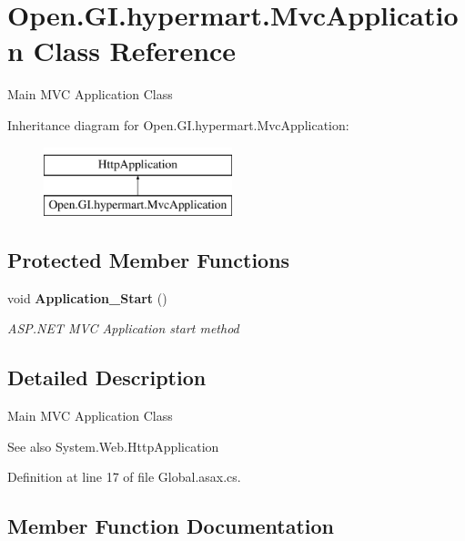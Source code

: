 \section{Open.\+G\+I.\+hypermart.\+Mvc\+Application Class Reference}
\label{class_open_1_1_g_i_1_1hypermart_1_1_mvc_application}


Main M\+VC Application Class  


Inheritance diagram for Open.\+G\+I.\+hypermart.\+Mvc\+Application\+:\begin{figure}[H]
\begin{center}
\leavevmode
\includegraphics[height=2.000000cm]{class_open_1_1_g_i_1_1hypermart_1_1_mvc_application}
\end{center}
\end{figure}
\subsection*{Protected Member Functions}
\begin{DoxyCompactItemize}
\item 
void \textbf{ Application\+\_\+\+Start} ()
\begin{DoxyCompactList}\small\item\em A\+S\+P.\+N\+ET M\+VC Application start method \end{DoxyCompactList}\end{DoxyCompactItemize}


\subsection{Detailed Description}
Main M\+VC Application Class 

\begin{DoxySeeAlso}{See also}
System.\+Web.\+Http\+Application


\end{DoxySeeAlso}


Definition at line 17 of file Global.\+asax.\+cs.



\subsection{Member Function Documentation}
\mbox{\label{class_open_1_1_g_i_1_1hypermart_1_1_mvc_application_a8169da76cd5c9b98983e4eee8d40ce4e}} 
